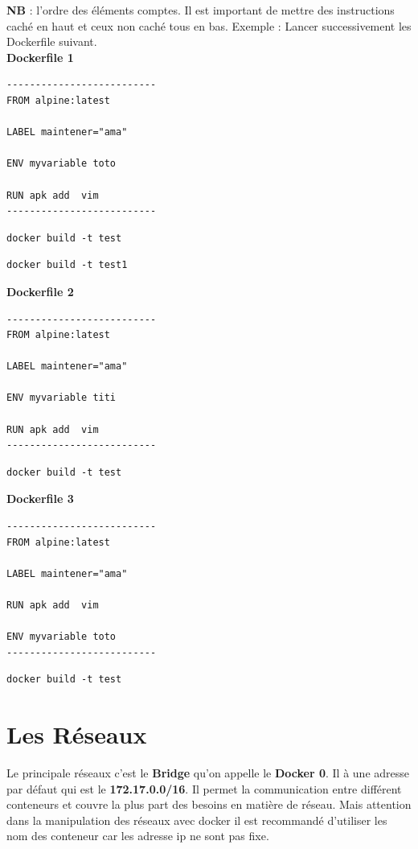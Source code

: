 \documentclass[12pt,a4paper]{article}
\begin{document}
\textbf{NB } : l'ordre des éléments comptes. Il est important de mettre des instructions
caché en haut et ceux non caché tous en bas.
Exemple : Lancer successivement les Dockerfile suivant.\\
\textbf{Dockerfile 1}
\begin{verbatim}
--------------------------
FROM alpine:latest

LABEL maintener="ama"

ENV myvariable toto

RUN apk add  vim
--------------------------
\end{verbatim} 
\begin{verbatim}
docker build -t test
\end{verbatim}
\begin{verbatim}
docker build -t test1
\end{verbatim}
\textbf{Dockerfile 2}
\begin{verbatim}
--------------------------
FROM alpine:latest

LABEL maintener="ama"

ENV myvariable titi

RUN apk add  vim
--------------------------
\end{verbatim} 
\begin{verbatim}
docker build -t test
\end{verbatim}
\textbf{Dockerfile 3}
\begin{verbatim}
--------------------------
FROM alpine:latest

LABEL maintener="ama"

RUN apk add  vim

ENV myvariable toto
--------------------------
\end{verbatim} 
\begin{verbatim}
docker build -t test
\end{verbatim}

\section{Les Réseaux}
Le principale réseaux c'est le \textbf{Bridge} qu'on appelle le \textbf{Docker 0}.
Il à une adresse par défaut qui est le
\textbf{172.17.0.0/16}. Il permet la communication entre différent conteneurs et couvre 
la plus part des besoins en matière de réseau. Mais attention dans la manipulation des 
réseaux avec docker il est recommandé d'utiliser les nom des conteneur car les adresse 
ip ne sont pas fixe.
\end{document}
